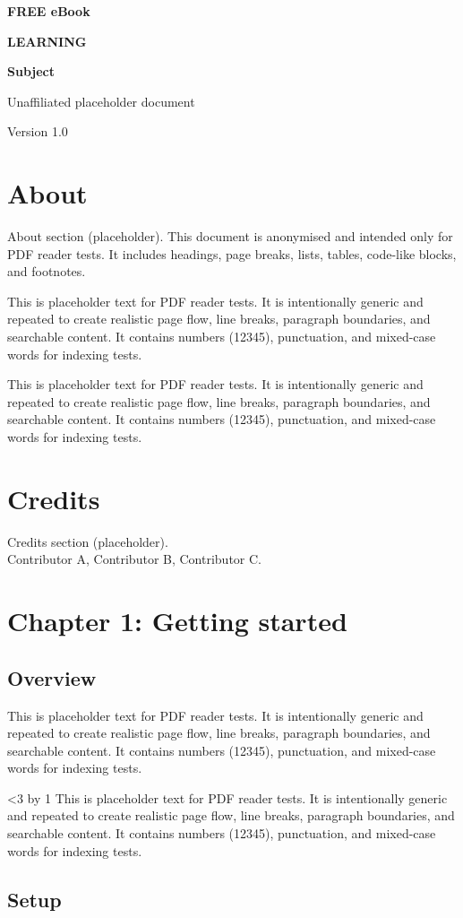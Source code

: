 \documentclass[a4paper,11pt,openany]{book}
\makeatletter
\renewcommand\frontmatter{%
  \if@openright\cleardoublepage\else\clearpage\fi
  \@mainmatterfalse
  \renewcommand\thepage{\roman{page}}%
}
\renewcommand\mainmatter{%
  \if@openright\cleardoublepage\else\clearpage\fi
  \@mainmattertrue
  \renewcommand\thepage{\arabic{page}}%
}
\newcommand{\filler}{%
This is placeholder text for PDF reader tests. It is intentionally generic and repeated to
create realistic page flow, line breaks, paragraph boundaries, and searchable content.
It contains numbers (12345), punctuation, and mixed-case words for indexing tests. \par\medskip
}
\newcommand{\manyfiller}[1]{%
\begingroup
\fillercount=0
\loop\ifnum\fillercount<#1
  \advance\fillercount by 1
  \filler
\repeat
\endgroup
}
\makeatother
\begin{document}
\frontmatter

\begin{titlepage}
  \centering
  \vspace*{2cm}
  {\Large \textbf{FREE eBook}\par}
  \vspace{2cm}
  {\Huge \textbf{LEARNING}\par}
  \vspace{0.2cm}
  {\Huge \textbf{Subject}\par}
  \vfill
  {\large Unaffiliated placeholder document\par}
  \vspace{0.5cm}
  {\large Version 1.0\par}
\end{titlepage}

\renewcommand{\contentsname}{Table of Contents}
\tableofcontents
\clearpage

\chapter*{About}
\noindent
About section (placeholder). This document is anonymised and intended only for PDF reader tests.
It includes headings, page breaks, lists, tables, code-like blocks, and footnotes.
\par\medskip
\filler
\filler

\chapter*{Credits}
Credits section (placeholder).\\
Contributor A, Contributor B, Contributor C.

\mainmatter

\chapter{Chapter 1: Getting started}
\section{Overview}
\filler\manyfiller{3}

\section{Setup}
\end{document}
